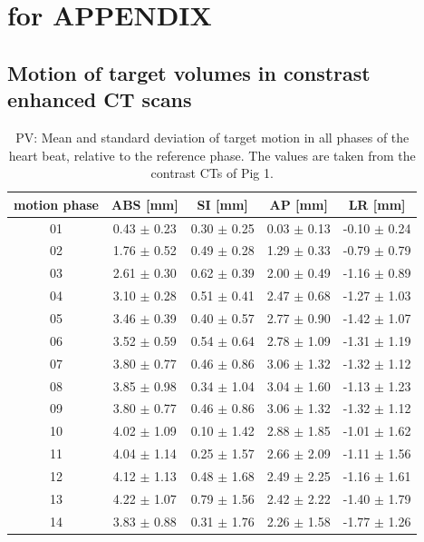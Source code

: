 \documentclass[type=dr, dr=rernat, accentcolor=tud7b,colorbacktitle, bigchapter, openright, twoside, 12pt ]{tudthesis}
\begin{document}
\newpage

\section*{for APPENDIX}

\subsection*{Motion of target volumes in constrast enhanced CT scans}

\begin{table}[htbp]
  \centering
     \tiny 
  \caption{PV: Mean and standard deviation of target motion in all phases of the heart beat, relative to the reference phase. The values are 
  taken from the contrast CTs of Pig 1.}
  \begin{tabular}{|c|c|c|c|c|}
    \hline\hline
    motion phase\rule{0pt}{2.6ex}\rule[-1.2ex]{0pt}{0pt} & ABS [mm] & SI [mm] & AP [mm] & LR [mm]\\
    \hline
01 &0.43 $\pm$ 0.23 &0.30 $\pm$ 0.25 &0.03 $\pm$ 0.13 &-0.10 $\pm$ 0.24 \\
02 &1.76 $\pm$ 0.52 &0.49 $\pm$ 0.28 &1.29 $\pm$ 0.33 &-0.79 $\pm$ 0.79 \\
03 &2.61 $\pm$ 0.30 &0.62 $\pm$ 0.39 &2.00 $\pm$ 0.49 &-1.16 $\pm$ 0.89 \\
04 &3.10 $\pm$ 0.28 &0.51 $\pm$ 0.41 &2.47 $\pm$ 0.68 &-1.27 $\pm$ 1.03 \\
05 &3.46 $\pm$ 0.39 &0.40 $\pm$ 0.57 &2.77 $\pm$ 0.90 &-1.42 $\pm$ 1.07 \\
06 &3.52 $\pm$ 0.59 &0.54 $\pm$ 0.64 &2.78 $\pm$ 1.09 &-1.31 $\pm$ 1.19 \\
07 &3.80 $\pm$ 0.77 &0.46 $\pm$ 0.86 &3.06 $\pm$ 1.32 &-1.32 $\pm$ 1.12 \\
08 &3.85 $\pm$ 0.98 &0.34 $\pm$ 1.04 &3.04 $\pm$ 1.60 &-1.13 $\pm$ 1.23 \\
09 &3.80 $\pm$ 0.77 &0.46 $\pm$ 0.86 &3.06 $\pm$ 1.32 &-1.32 $\pm$ 1.12 \\
10 &4.02 $\pm$ 1.09 &0.10 $\pm$ 1.42 &2.88 $\pm$ 1.85 &-1.01 $\pm$ 1.62 \\
11 &4.04 $\pm$ 1.14 &0.25 $\pm$ 1.57 &2.66 $\pm$ 2.09 &-1.11 $\pm$ 1.56 \\
12 &4.12 $\pm$ 1.13 &0.48 $\pm$ 1.68 &2.49 $\pm$ 2.25 &-1.16 $\pm$ 1.61 \\
13 &4.22 $\pm$ 1.07 &0.79 $\pm$ 1.56 &2.42 $\pm$ 2.22 &-1.40 $\pm$ 1.79 \\
14 &3.83 $\pm$ 0.88 &0.31 $\pm$ 1.76 &2.26 $\pm$ 1.58 &-1.77 $\pm$ 1.26 \\

\end{tabular}
\end{table}
\end{document}
